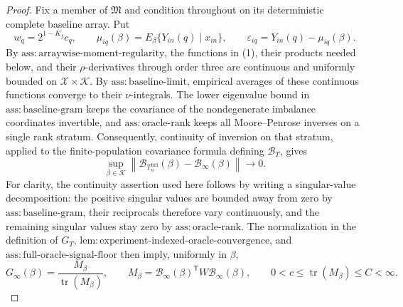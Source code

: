 \documentclass{article}
\begin{document}
\begin{proof}
Fix a member of \(\mathfrak M\) and condition throughout on its deterministic complete baseline array.  Put
\[
w_q=2^{1-K_f}c_q,
\qquad
\mu_{iq}(\beta)=E_\beta\{Y_{in}(q)\mid x_{in}\},
\qquad
\varepsilon_{iq}=Y_{in}(q)-\mu_{iq}(\beta).
\tag{1}
\]
By \(\mathrm{ass{:}arraywise\text{-}moment\text{-}regularity}\), the functions in (1), their products needed below, and their \(\rho\)-derivatives through order three are continuous and uniformly bounded on \(\mathcal X\times\mathcal K\).  By \(\mathrm{ass{:}baseline\text{-}limit}\), empirical averages of these continuous functions converge to their \(\nu\)-integrals.  The lower eigenvalue bound in \(\mathrm{ass{:}baseline\text{-}gram}\) keeps the covariance of the nondegenerate imbalance coordinates invertible, and \(\mathrm{ass{:}oracle\text{-}rank}\) keeps all Moore--Penrose inverses on a single rank stratum.  Consequently, continuity of inversion on that stratum, applied to the finite-population covariance formula defining \(\mathcal B_T\), gives
\[
\sup_{\beta\in\mathcal K}
\left\|\mathcal B_{T_n^{\mathrm{full}}}(\beta)
-\mathcal B_\infty(\beta)\right\|\longrightarrow0.
\tag{2}
\]
For clarity, the continuity assertion used here follows by writing a singular-value decomposition: the positive singular values are bounded away from zero by \(\mathrm{ass{:}baseline\text{-}gram}\), their reciprocals therefore vary continuously, and the remaining singular values stay zero by \(\mathrm{ass{:}oracle\text{-}rank}\).  The normalization in the definition of \(G_T\), \(\mathrm{lem{:}experiment\text{-}indexed\text{-}oracle\text{-}convergence}\), and \(\mathrm{ass{:}full\text{-}oracle\text{-}signal\text{-}floor}\) then imply, uniformly in \(\beta\),
\[
G_\infty(\beta)=\frac{M_\beta}{\operatorname{tr}(M_\beta)},
\qquad
M_\beta=\mathcal B_\infty(\beta)^{\mathsf T}
W\mathcal B_\infty(\beta),
\qquad
0<c\leq\operatorname{tr}(M_\beta)\leq C<\infty.
\tag{3}
\]


\end{proof}
\end{document}
